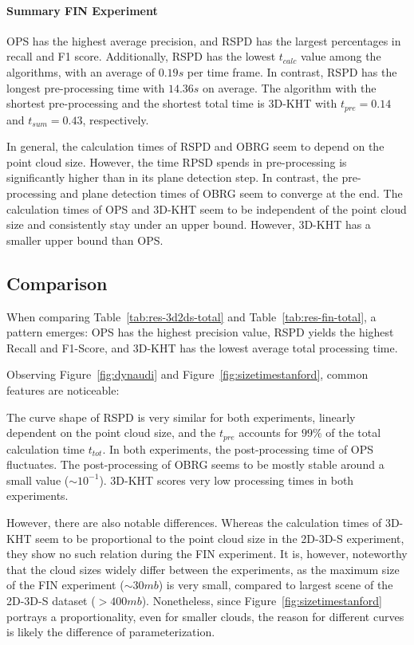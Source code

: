\documentclass[main.tex]{subfiles}
\begin{document}
\paragraph{Summary FIN Experiment}
OPS has the highest average precision, and RSPD has the largest percentages in recall and F1 score. Additionally, RSPD has the lowest $t_{calc}$ value among the algorithms,
with an average of $0.19s$ per time frame. In contrast, RSPD has the longest pre-processing time with $14.36s$ on average.
The algorithm with the shortest pre-processing and the shortest total time is 3D-KHT with $t_{pre}=0.14$ and $t_{sum}=0.43$,
respectively.


In general, the calculation times of RSPD and OBRG seem to depend on the point cloud size.
However, the time RPSD spends in pre-processing is significantly higher than in its plane detection step.
In contrast, the pre-processing and plane detection times of OBRG seem to converge at the end.
The calculation times of OPS and 3D-KHT seem to be independent of the point cloud size and consistently stay under an upper bound.
However, 3D-KHT has a smaller upper bound than OPS.


\subsection{Comparison}
When comparing Table~\ref{tab:res-3d2ds-total} and Table~\ref{tab:res-fin-total}, a pattern emerges:
OPS has the highest precision value, RSPD yields the highest Recall and F1-Score, and 3D-KHT has the lowest
average total processing time.

Observing Figure~\ref{fig:dynaudi} and Figure~\ref{fig:sizetimestanford}, common features are noticeable:

The curve shape of RSPD is very similar for both experiments, linearly dependent on the point cloud size, and the
$t_{pre}$ accounts for $99\%$ of the total calculation time $t_{tot}$.
In both experiments, the post-processing time of OPS fluctuates.
The post-processing of OBRG seems to be mostly stable around a small value (${\sim}10^{-1}$).
3D-KHT scores very low processing times in both experiments.

However, there are also notable differences.
Whereas the calculation times of 3D-KHT seem to be proportional to the point cloud size in the 2D-3D-S experiment, they show no such
relation during the FIN experiment. It is, however, noteworthy that the cloud sizes widely differ between the experiments, as the
maximum size of the FIN experiment (${\sim}30mb$) is very small, compared to largest scene of the 2D-3D-S dataset (${>}400mb$).
Nonetheless, since Figure~\ref{fig:sizetimestanford} portrays a proportionality, even for smaller clouds, the reason for
different curves is likely the difference of parameterization.
\end{document}
